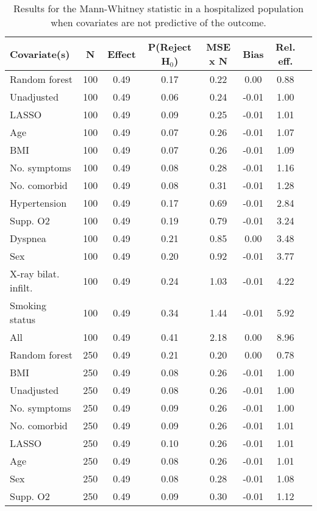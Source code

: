 \documentclass{article}
\begin{document}
{\tabcolsep=6pt  %
\begin{longtable}{lccccccc}
\caption{Results for the Mann-Whitney statistic in a hospitalized population when covariates are not predictive of the outcome.} \\
Covariate(s) & N & Effect & P(Reject H$_0$) & MSE x N & Bias & Rel. eff.\\ \midrule
Random forest & 100 & 0.49 & 0.17 & 0.22 &  0.00 & 0.88 \\ 
Unadjusted & 100 & 0.49 & 0.06 & 0.24 & -0.01 & 1.00 \\ 
LASSO & 100 & 0.49 & 0.09 & 0.25 & -0.01 & 1.01 \\ 
Age & 100 & 0.49 & 0.07 & 0.26 & -0.01 & 1.07 \\ 
BMI & 100 & 0.49 & 0.07 & 0.26 & -0.01 & 1.09 \\ 
No. symptoms & 100 & 0.49 & 0.08 & 0.28 & -0.01 & 1.16 \\ 
No. comorbid & 100 & 0.49 & 0.08 & 0.31 & -0.01 & 1.28 \\ 
Hypertension & 100 & 0.49 & 0.17 & 0.69 & -0.01 & 2.84 \\ 
Supp. O2 & 100 & 0.49 & 0.19 & 0.79 & -0.01 & 3.24 \\ 
Dyspnea & 100 & 0.49 & 0.21 & 0.85 &  0.00 & 3.48 \\ 
Sex & 100 & 0.49 & 0.20 & 0.92 & -0.01 & 3.77 \\ 
X-ray bilat. infilt. & 100 & 0.49 & 0.24 & 1.03 & -0.01 & 4.22 \\ 
Smoking status & 100 & 0.49 & 0.34 & 1.44 & -0.01 & 5.92 \\ 
All & 100 & 0.49 & 0.41 & 2.18 &  0.00 & 8.96 \\ \midrule() 
Random forest & 250 & 0.49 & 0.21 & 0.20 &  0.00 & 0.78 \\ 
BMI & 250 & 0.49 & 0.08 & 0.26 & -0.01 & 1.00 \\ 
Unadjusted & 250 & 0.49 & 0.08 & 0.26 & -0.01 & 1.00 \\ 
No. symptoms & 250 & 0.49 & 0.09 & 0.26 & -0.01 & 1.00 \\ 
No. comorbid & 250 & 0.49 & 0.09 & 0.26 & -0.01 & 1.01 \\ 
LASSO & 250 & 0.49 & 0.10 & 0.26 & -0.01 & 1.01 \\ 
Age & 250 & 0.49 & 0.08 & 0.26 & -0.01 & 1.01 \\ 
Sex & 250 & 0.49 & 0.08 & 0.28 & -0.01 & 1.08 \\ 
Supp. O2 & 250 & 0.49 & 0.09 & 0.30 & -0.01 & 1.12 \\ 

\end{longtable}}
\end{document}
